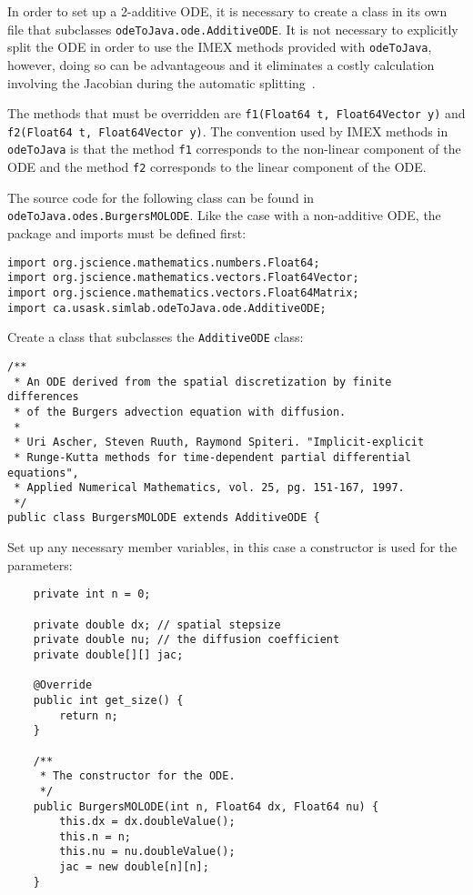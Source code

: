 \documentclass[10pt,letterpaper]{article}
\newcommand\odj{{\tt odeToJava}}
\begin{document}
In order to set up a 2-additive ODE, it is necessary to create a class in its
own file that subclasses {\tt odeToJava.ode.AdditiveODE}. It is not necessary to
explicitly split the ODE in order to use the IMEX methods provided with \odj,
however, doing so can be advantageous and it eliminates a costly calculation
involving the Jacobian during the automatic splitting~\cite{CooperSayfy1983}.

The methods that must be overridden are {\tt f1(Float64 t, Float64Vector y)} and
{\tt f2(Float64 t, Float64Vector y)}. The convention used by IMEX methods in
\odj{} is that the method {\tt f1} corresponds to the non-linear component of
the ODE and the method {\tt f2} corresponds to the linear component of the ODE.

The source code for the following class can be found in {\tt
odeToJava.odes.BurgersMOLODE}. Like the case with a non-additive ODE, the
package and imports must be defined first:

\begin{lstlisting}
import org.jscience.mathematics.numbers.Float64;
import org.jscience.mathematics.vectors.Float64Vector;
import org.jscience.mathematics.vectors.Float64Matrix;
import ca.usask.simlab.odeToJava.ode.AdditiveODE;
\end{lstlisting}

Create a class that subclasses the {\tt AdditiveODE} class:

\begin{lstlisting}
/**
 * An ODE derived from the spatial discretization by finite differences
 * of the Burgers advection equation with diffusion.
 *
 * Uri Ascher, Steven Ruuth, Raymond Spiteri. "Implicit-explicit
 * Runge-Kutta methods for time-dependent partial differential equations",
 * Applied Numerical Mathematics, vol. 25, pg. 151-167, 1997.
 */
public class BurgersMOLODE extends AdditiveODE {
\end{lstlisting}

Set up any necessary member variables, in this case a constructor is used for
the parameters:

\begin{lstlisting}
    private int n = 0;

    private double dx; // spatial stepsize
    private double nu; // the diffusion coefficient
    private double[][] jac;

    @Override
    public int get_size() {
        return n;
    } 

    /**
     * The constructor for the ODE.
     */
    public BurgersMOLODE(int n, Float64 dx, Float64 nu) {
        this.dx = dx.doubleValue();
        this.n = n;
        this.nu = nu.doubleValue();
        jac = new double[n][n];
    }
\end{lstlisting}
\end{document}
